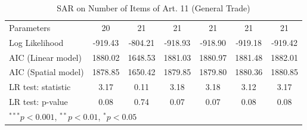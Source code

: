 \begin{table}[!h]
\begin{center}
\begin{tabular}{l c c c c c c }
Parameters              & 20           & 21           & 21           & 21           & 21           & 21           \\
Log Likelihood          & -919.43      & -804.21      & -918.93      & -918.90      & -919.18      & -919.42      \\
AIC (Linear model)      & 1880.02      & 1648.53      & 1881.03      & 1880.97      & 1881.48      & 1882.01      \\
AIC (Spatial model)     & 1878.85      & 1650.42      & 1879.85      & 1879.80      & 1880.36      & 1880.85      \\
LR test: statistic      & 3.17         & 0.11         & 3.18         & 3.18         & 3.12         & 3.17         \\
LR test: p-value        & 0.08         & 0.74         & 0.07         & 0.07         & 0.08         & 0.08         \\
\bottomrule
\multicolumn{7}{l}{\scriptsize{$^{***}p<0.001$, $^{**}p<0.01$, $^*p<0.05$}}
\end{tabular}
\caption{SAR on Number of Items of Art. 11 (General Trade)}
\label{table:coefficients}
\end{center}
\end{table}
